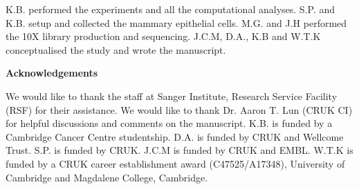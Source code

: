 \documentclass[titlepage, 12pt, oneside]{amsart}
\begin{document}
K.B. performed the experiments and all the computational analyses.
S.P. and K.B. setup and collected the mammary epithelial cells.
M.G. and J.H performed the 10X library production and sequencing.
J.C.M, D.A., K.B and W.T.K conceptualised the study and wrote the manuscript.

\textbf{Acknowledgements}

We would like to thank the staff at Sanger Institute, Research Service Facility (RSF) for their assistance.
We would like to thank Dr. Aaron T. Lun (CRUK CI) for helpful discussions and comments on the manuscript.
K.B. is funded by a Cambridge Cancer Centre studentship.
D.A. is funded by CRUK and Wellcome Trust.
S.P. is funded by CRUK.
J.C.M is funded by CRUK and EMBL.
W.T.K is funded by a CRUK career establishment award (C47525/A17348), University of Cambridge and Magdalene College, Cambridge.

\printbibliography
\end{document}
